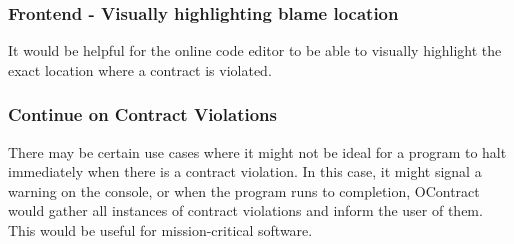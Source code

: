 \documentclass[a4paper]{article}
\begin{document}
\subsubsection{Frontend - Visually highlighting blame location}

It would be helpful for the online code editor to be able to visually highlight the exact location
where a contract is violated.

\subsubsection{Continue on Contract Violations}

There may be certain use cases where it might not be ideal for a program to halt immediately
when there is a contract violation. In this case, it might signal a warning on the console,
or when the program runs to completion, OContract would gather all instances of contract violations
and inform the user of them. This would be useful for mission-critical software.



\end{document}
